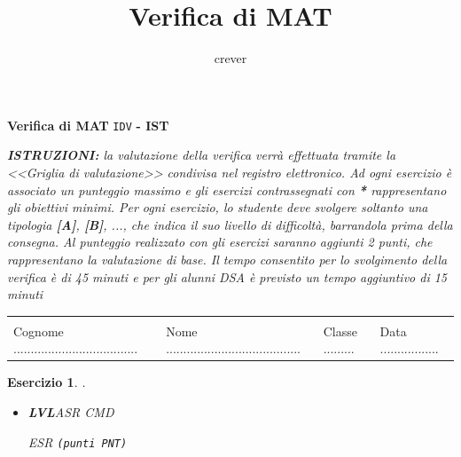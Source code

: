 \documentclass[a4paper,12pt]{article}
\title{Verifica di {MAT} }
\author{crever}
\theoremstyle{plain}
\newtheorem{esercizio}{Esercizio}
\begin{document}

\begin{center}
	{\textbf{Verifica di {MAT}} \verb!IDV! \textbf{- {IST} }}
\end{center}

\small{\textit{\textbf{ISTRUZIONI:} la valutazione della verifica verrà effettuata tramite la <<Griglia di valutazione>> condivisa nel registro
elettronico. Ad ogni esercizio è associato un punteggio massimo e gli esercizi contrassegnati con \emph{\textbf{*}} rappresentano gli obiettivi minimi. Per ogni esercizio, lo studente deve svolgere soltanto una tipologia \emph{\textbf{[A]}}, \emph{\textbf{[B]}}, ..., che indica il suo livello di difficolt{\`a}, barrandola prima della consegna. Al punteggio realizzato con gli esercizi saranno aggiunti 2 punti, che rappresentano la valutazione di base. Il tempo consentito per lo svolgimento della verifica è di 45 minuti e per gli alunni DSA è previsto un tempo aggiuntivo di 15 minuti}}

\begin{center}
	\begin{tabular}{llll}
		&  &  & \\
		Cognome .................................... & 
		Nome ....................................... &
		Classe ......... & 
		Data .................\\
	\end{tabular}
\end{center}


\begin{esercizio}{.}
	\begin{itemize}
		\item \emph{\textbf{LVL}{ASR} {CMD}} 
			
		{ESR}
		\hspace*{\fill} {\verb!(punti PNT)!}
		\medskip
	\end{itemize}
\end{esercizio}	
\end{document}
